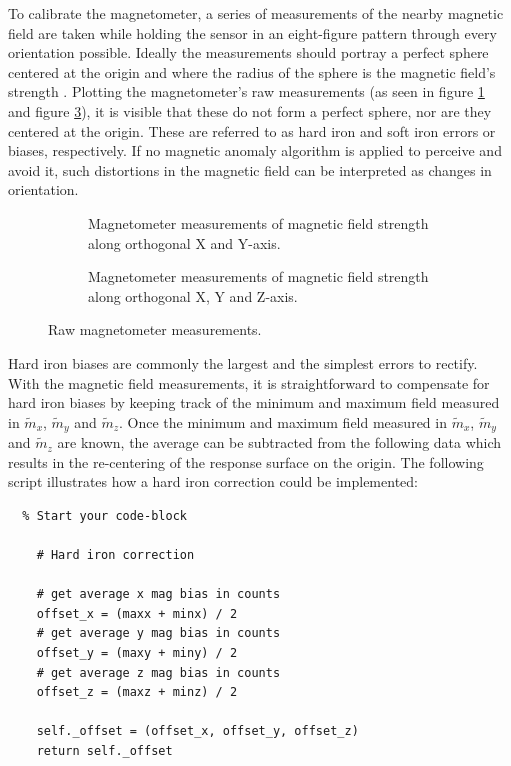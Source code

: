 To calibrate the magnetometer, a series of measurements of the nearby magnetic field are taken while holding the sensor in an eight-figure pattern through every orientation possible. Ideally the measurements should portray a perfect sphere centered at the origin and where the radius of the sphere is the magnetic field's strength \cite{kok2016magnetometer}. Plotting the magnetometer's raw measurements (as seen in figure \ref{plt:raw_magnetometer} and figure \ref{plt:raw_magnetometer3D}), it is visible that these do not form a perfect sphere, nor are they centered at the origin. These are referred to as hard iron and soft iron errors or biases, respectively. If no magnetic anomaly algorithm is applied to perceive and avoid it, such distortions in the magnetic field can be interpreted as changes in orientation.

\begin{figure}[!h]
    \centering
    \begin{subfigure}{0.7\textwidth}
        \centering
        \resizebox{1\linewidth}{!}{}
        \caption{Magnetometer measurements of magnetic field strength along orthogonal X and Y-axis.}
        \label{plt:raw_magnetometer}
    \end{subfigure}

    \begin{subfigure}{0.7\textwidth}
        \centering
        \resizebox{1\linewidth}{!}{}
        \caption{Magnetometer measurements of magnetic field strength along orthogonal X, Y and Z-axis.}
        \label{plt:raw_magnetometer3D}
    \end{subfigure}
    \caption{Raw magnetometer measurements.}
\end{figure}

Hard iron biases are commonly the largest and the simplest errors to rectify. With the magnetic field measurements, it is straightforward to compensate for hard iron biases by keeping track of the minimum and maximum field measured in $\widetilde{m}_x$, $\widetilde{m}_y$ and $\widetilde{m}_z$. Once the minimum and maximum field measured in $\widetilde{m}_x$, $\widetilde{m}_y$ and $\widetilde{m}_z$ are known, the average can be subtracted from the following data which results in the re-centering of the response surface on the origin. The following script illustrates how a hard iron correction could be implemented:

\lstset{language=Python}
\begin{lstlisting}  % Start your code-block

    # Hard iron correction

    # get average x mag bias in counts
    offset_x = (maxx + minx) / 2
    # get average y mag bias in counts
    offset_y = (maxy + miny) / 2
    # get average z mag bias in counts
    offset_z = (maxz + minz) / 2

    self._offset = (offset_x, offset_y, offset_z)
    return self._offset
\end{lstlisting}

